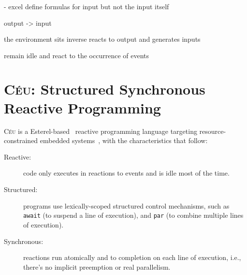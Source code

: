 \documentclass[sigplan,10pt,review,anonymous]{acmart}\settopmatter{printfolios=true,printccs=false,printacmref=false}
\newcommand{\CEU}{\textsc{C\'{e}u}\xspace}
\newcommand{\code}[1] {{\small{\texttt{#1}}}}
\begin{document}

- excel define formulas for input but not the input itself

output -> input

the environment sits
    inverse
    reacts to output and generates inputs

remain idle and react to the occurrence of events 


\section{\CEU: Structured Synchronous Reactive Programming}
\label{sec.ceu}

\CEU is a Esterel-based~\cite{ceu.tecs17} reactive programming language
targeting resource-constrained embedded systems~\cite{ceu.sensys13}, with the
characteristics that follow:
%
\begin{description}
\item [Reactive:] code only executes in reactions to events and is idle most of
    the time.
\item [Structured:] programs use lexically-scoped structured control
    mechanisms, such as \code{await} (to suspend a line of execution), and
    \code{par} (to combine multiple lines of execution).
\item [Synchronous:] reactions run atomically and to completion on each line of
    execution, i.e., there's no implicit preemption or real parallelism.
\end{description}
\end{document}

